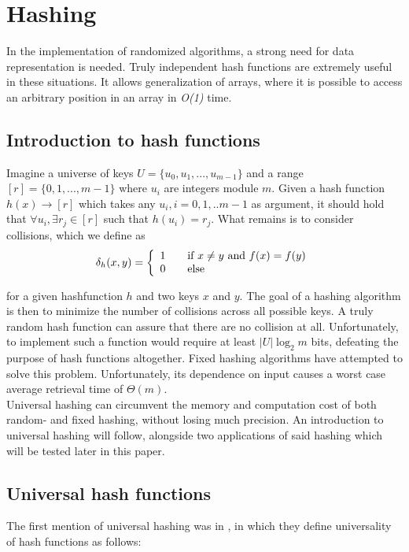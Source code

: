 \documentclass[../../main.tex]{subfiles}
\begin{document}
\section{Hashing}
In the implementation of randomized algorithms, a strong need for data representation is needed. Truly independent hash functions are extremely useful in these situations. It allows generalization of arrays, where it is possible to access an arbitrary position in an array in \textit{O(1)} time.\\

\subsection{Introduction to hash functions}
Imagine a universe of keys $U=\{u_{0},u_{1},...,u_{m-1}\}$ and a range $[r]=\{0,1,...,m-1\}$ where $u_i$ are integers module $m$. Given a hash function $h(x)\rightarrow [r]$ which takes any $u_i,i=0,1,..m-1$ as argument, it should hold that $\forall u_i,\exists r_j \in [r]$ such that $h(u_i)= r_j$. What remains is to consider collisions, which we define as
\begin{equation}\label{collision}
\delta_h(x,y) = \left\{ 
  \begin{array}{l l}
    1 & \quad \text{if $x\neq y$ and $f(x)=f(y)$}\\
    0 & \quad \text{else}
  \end{array} \right.
\end{equation}

for a given hashfunction $h$ and two keys $x$ and $y$. The goal of a hashing algorithm is then to minimize the number of collisions across all possible keys. A truly random hash function can assure that there are no collision at all. Unfortunately, to implement such a function would require at least $|U|\log_2 m$ bits\cite{dikuHash}, defeating the purpose of hash functions altogether. Fixed hashing algorithms have attempted to solve this problem. Unfortunately, its dependence on input causes a worst case average retrieval time of $\Theta(m)$.\cite{introToAlg}\\

Universal hashing can circumvent the memory and computation cost of both random- and fixed hashing, without losing much precision. An introduction to universal hashing will follow, alongside two applications of said hashing which will be tested later in this paper.

\subsection{Universal hash functions}
The first mention of universal hashing was in \cite{carterWegman}, in which they define universality of hash functions as follows:\\
\end{document}
